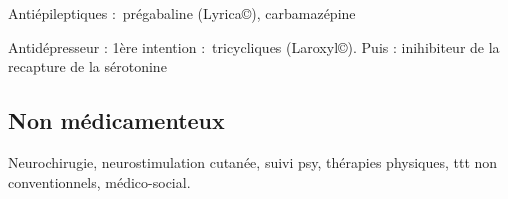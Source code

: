 \documentclass{article}
\begin{document}
Antiépileptiques : prégabaline (Lyrica\copyright), carbamazépine

Antidépresseur : 1ère intention : tricycliques (Laroxyl\copyright). Puis : inihibiteur de la recapture de la sérotonine


\subsection{Non médicamenteux}%
\label{sub:non_medicamenteux}

Neurochirugie, neurostimulation cutanée, suivi psy, thérapies physiques, ttt non
conventionnels, médico-social.
\end{document}
